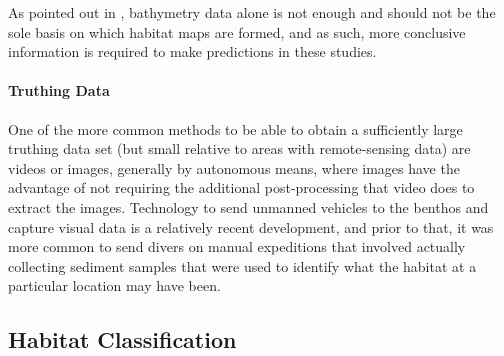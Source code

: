 As pointed out in \cite{calvert15}, bathymetry data alone is not enough and should not be the sole basis on which habitat maps are formed, and as such, more conclusive information is required to make predictions in these studies.

\paragraph{Truthing Data}
One of the more common methods to be able to obtain a sufficiently large truthing data set (but small relative to areas with remote-sensing data) are videos or images, generally by autonomous means, where images have the advantage of not requiring the additional post-processing that video does to extract the images. Technology to send unmanned vehicles to the benthos and capture visual data is a relatively recent development, and prior to that, it was more common to send divers on manual expeditions that involved actually collecting sediment samples that were used to identify what the habitat at a particular location may have been. 

% 

\subsection{Habitat Classification}

